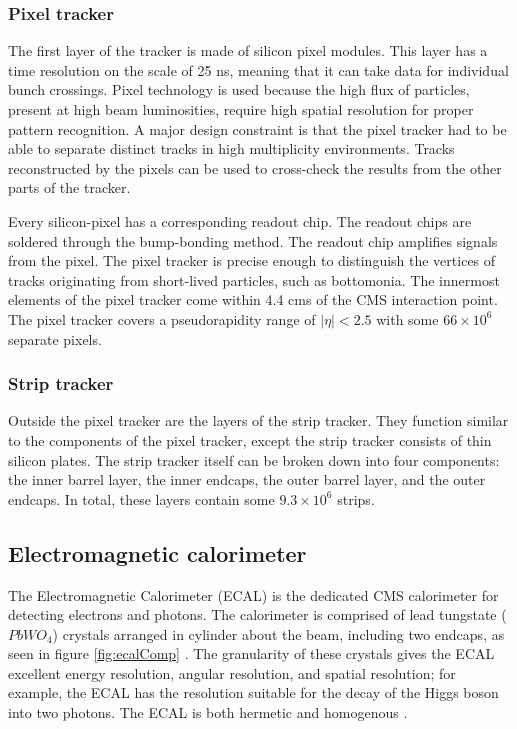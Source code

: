 \subsubsection{Pixel tracker}

The first layer of the tracker is made of silicon pixel modules. This layer has a time resolution on the scale of 25 ns, meaning that it can take data for individual bunch crossings. Pixel technology is used because the high flux of particles, present at high beam luminosities, require high spatial resolution for proper pattern recognition. A major design constraint is that the pixel tracker had to be able to separate distinct tracks in high multiplicity environments. Tracks reconstructed by the pixels can be used to cross-check the results from the other parts of the tracker. 

Every silicon-pixel has a corresponding readout chip. The readout chips are soldered through the bump-bonding method. The readout chip amplifies signals from the pixel. The pixel tracker is precise enough to distinguish the vertices of tracks originating from short-lived particles, such as bottomonia. The innermost elements of the pixel tracker come within 4.4 cms of the CMS interaction point. The pixel tracker covers a pseudorapidity range of $|\eta|<2.5$ with some $66 \times 10^6$ separate pixels.

\subsubsection{Strip tracker}

Outside the pixel tracker are the layers of the strip tracker. They function similar to the components of the pixel tracker, except the strip tracker consists of thin silicon plates. The strip tracker itself can be broken down into four components: the inner barrel layer, the inner endcaps, the outer barrel layer, and the outer endcaps. In total, these layers contain some $9.3 \times 10^6$ strips. 

\subsection{Electromagnetic calorimeter}

The Electromagnetic Calorimeter (ECAL) is the dedicated CMS calorimeter for detecting electrons and photons. The calorimeter is comprised of lead tungstate ($PbWO_4$) crystals arranged in cylinder about the beam, including two endcaps, as seen in figure \ref{fig:ecalComp} \cite{Benaglia:2014aqa}. The granularity of these crystals gives the ECAL excellent energy resolution, angular resolution, and spatial resolution; for example, the ECAL has the resolution suitable for the decay of the Higgs boson into two photons. The ECAL is both hermetic and homogenous \cite{elect_cms_note06}. 


